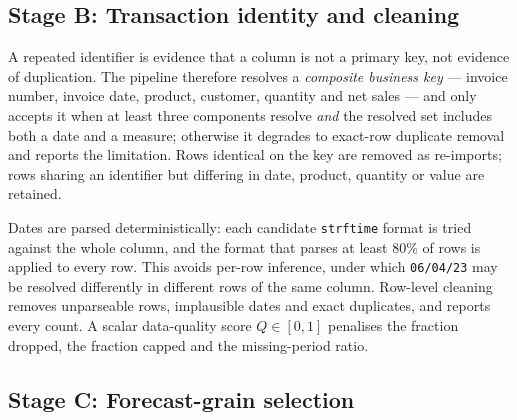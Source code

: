 \documentclass[conference]{IEEEtran}
\begin{document}
\subsection{Stage B: Transaction identity and cleaning}

A repeated identifier is evidence that a column is not a primary key, not
evidence of duplication. The pipeline therefore resolves a \emph{composite
business key} --- invoice number, invoice date, product, customer, quantity and
net sales --- and only accepts it when at least three components
resolve \emph{and} the resolved set includes both a date and a measure; otherwise it degrades to
exact-row duplicate removal and reports the limitation. Rows identical on the
key are removed as re-imports; rows sharing an identifier but differing in
date, product, quantity or value are retained.

Dates are parsed deterministically: each candidate \texttt{strftime} format is
tried against the whole column, and the format that parses at least 80\% of
rows is applied to every row. This avoids per-row inference, under which
\texttt{06/04/23} may be resolved differently in different rows of the same
column. Row-level cleaning removes unparseable rows, implausible dates and
exact duplicates, and reports every count. A scalar data-quality score
$Q\in[0,1]$ penalises the fraction dropped, the fraction capped and the
missing-period ratio.

\subsection{Stage C: Forecast-grain selection}
\end{document}
